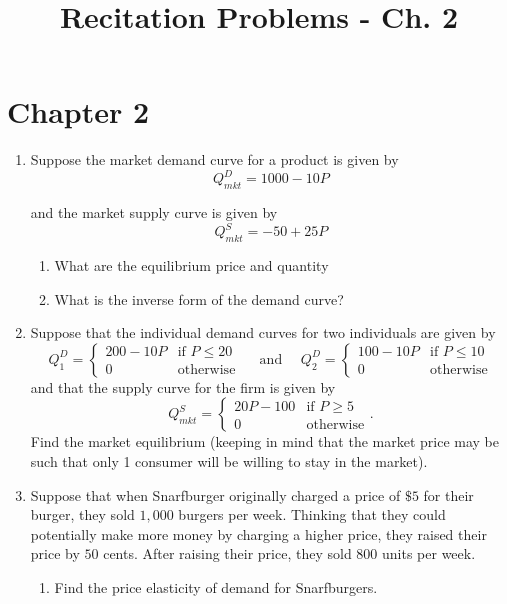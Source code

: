 \documentclass[11pt]{article}
\title{Recitation Problems - Ch. 2}
\begin{document}
  
\section*{Chapter 2}

\begin{enumerate}

	\item Suppose the market demand curve for a product is given by 
	$$
		Q^D_{mkt} = 1000 - 10P
	$$
	
	and the market supply curve is given by
	$$
		Q^S_{mkt} = -50 + 25P
	$$
	\begin{enumerate}
    \item What are the equilibrium price and quantity
    
    \item What is the inverse form of the demand curve?
  \end{enumerate}
  
  \newpage 
  \item Suppose that the individual demand curves for two individuals are given by
  $$
    Q^D_1 = \begin{cases} 
      200 - 10P & \text{if } P \leq 20 \\ 
      0         & \text{otherwise} 
    \end{cases}
    \quad\text{ and }\quad
    Q^D_2 = \begin{cases} 
      100 - 10P & \text{if } P \leq 10 \\ 
      0         & \text{otherwise} 
    \end{cases}
  $$
  and that the supply curve for the firm is given by
  $$
    Q^S_{mkt} = \begin{cases} 
      20P - 100 & \text{if } P \geq 5 \\ 
      0         & \text{otherwise} 
    \end{cases}.
  $$
  Find the market equilibrium (keeping in mind that the market price may be such that only 1 consumer will be willing to stay in the market).

  \newpage 
  \item Suppose that when Snarfburger originally charged a price of $\$5$ for their burger, they sold $1,000$ burgers per week. Thinking that they could potentially make more money by charging a higher price, they raised their price by $50$ cents. After raising their price, they sold $800$
  units per week. 
  
  \begin{enumerate}
    \item Find the price elasticity of demand for Snarfburgers. 
    

\end{enumerate}
\end{enumerate}
\end{document}
